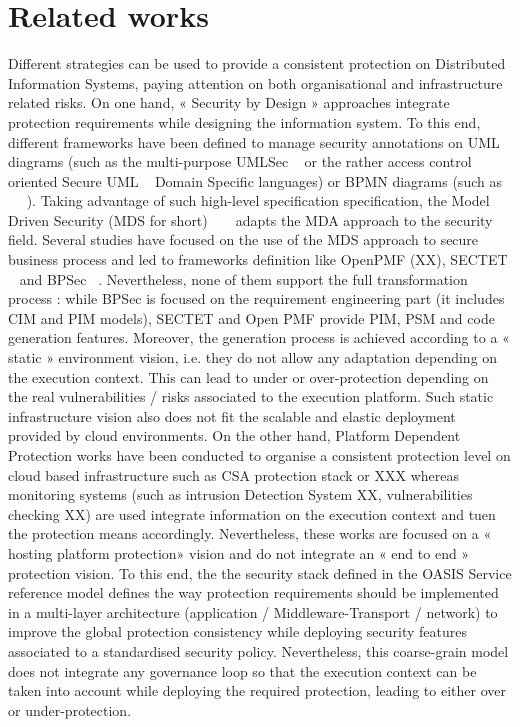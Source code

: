 \documentclass[runningheads,a4paper]{llncs}
\begin{document}
\section{Related works}

Different strategies can be used to provide a consistent protection on Distributed Information Systems, paying attention on both organisational and infrastructure related risks. On one hand, « Security by Design » approaches integrate protection requirements while designing the information system. To this end, different frameworks have been defined to manage security annotations on UML diagrams (such as the multi-purpose UMLSec ~\cite{JJ02} or the rather access control oriented  Secure UML ~\cite{LBD02} Domain Specific languages) or BPMN diagrams (such as ~\cite{WMS09} ~\cite{SSL09}). Taking advantage of such high-level specification specification, the Model Driven Security (MDS for short)  ~\cite{LS09} ~\cite{LZN14} adapts the MDA approach to the security field. Several studies have focused on the use of the MDS approach to secure business process and led to frameworks definition like OpenPMF (XX), SECTET ~\cite{AHB08} and BPSec ~\cite{RFP07}. Nevertheless, none of them support the full transformation process : while BPSec is focused on the requirement engineering part (it includes CIM and PIM models), SECTET and Open PMF provide PIM, PSM and code generation features. Moreover, the generation process is achieved according to a « static » environment vision, i.e. they do not allow any adaptation depending on the execution context. This can lead to under or over-protection depending on the real vulnerabilities / risks associated to the execution platform. Such static infrastructure vision also does not fit the scalable and elastic deployment provided by cloud environments.
On the other hand, Platform Dependent Protection works have been conducted to organise a consistent protection level on cloud based infrastructure such as CSA protection stack or XXX whereas monitoring systems (such as intrusion Detection System XX, vulnerabilities checking XX) are used integrate information on the execution context  and tuen the protection means accordingly. Nevertheless, these works are focused on a « hosting platform protection» vision and do not integrate an « end to end » protection vision. To this end, the the security stack defined in the  OASIS Service reference model defines the way protection requirements should be implemented in a multi-layer architecture (application / Middleware-Transport / network) to improve the global protection consistency while deploying security features associated to a standardised security policy. Nevertheless, this coarse-grain model does not integrate any governance loop so that the execution context can be taken into account while deploying the required protection, leading to either over or under-protection.
\end{document}
